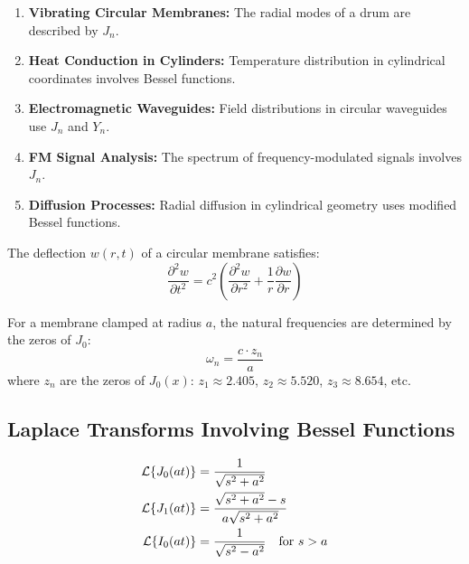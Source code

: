 \begin{enumerate}
    \item \textbf{Vibrating Circular Membranes:} The radial modes of a drum are described by $J_n$.

    \item \textbf{Heat Conduction in Cylinders:} Temperature distribution in cylindrical coordinates involves Bessel functions.

    \item \textbf{Electromagnetic Waveguides:} Field distributions in circular waveguides use $J_n$ and $Y_n$.

    \item \textbf{FM Signal Analysis:} The spectrum of frequency-modulated signals involves $J_n$.

    \item \textbf{Diffusion Processes:} Radial diffusion in cylindrical geometry uses modified Bessel functions.
\end{enumerate}

\begin{examplebox}[title=Example 10.5: Bessel Functions in Vibration Analysis]
The deflection $w(r,t)$ of a circular membrane satisfies:
\begin{equation}
\frac{\partial^2 w}{\partial t^2} = c^2 \left(\frac{\partial^2 w}{\partial r^2} + \frac{1}{r}\frac{\partial w}{\partial r}\right)
\end{equation}

For a membrane clamped at radius $a$, the natural frequencies are determined by the zeros of $J_0$:
\begin{equation}
\omega_n = \frac{c \cdot z_n}{a}
\end{equation}
where $z_n$ are the zeros of $J_0(x)$: $z_1 \approx 2.405$, $z_2 \approx 5.520$, $z_3 \approx 8.654$, etc.
\end{examplebox}

\subsection{Laplace Transforms Involving Bessel Functions}

\begin{align}
\mathcal{L}\{J_0(at)\} &= \frac{1}{\sqrt{s^2 + a^2}} \\
\mathcal{L}\{J_1(at)\} &= \frac{\sqrt{s^2 + a^2} - s}{a\sqrt{s^2 + a^2}} \\
\mathcal{L}\{I_0(at)\} &= \frac{1}{\sqrt{s^2 - a^2}} \quad \text{for } s > a
\end{align}

